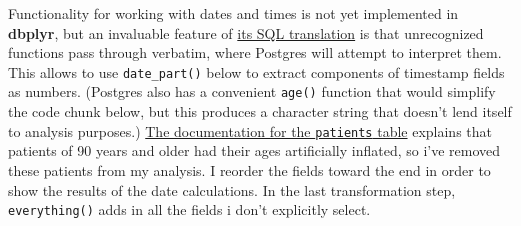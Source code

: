 \documentclass[]{article}
\begin{document}
Functionality for working with dates and times is not yet implemented in
\textbf{dbplyr}, but an invaluable feature of
\href{https://dbplyr.tidyverse.org/articles/sql-translation.html}{its
SQL translation} is that unrecognized functions pass through verbatim,
where Postgres will attempt to interpret them. This allows to use
\texttt{date\_part()} below to extract components of timestamp fields as
numbers. (Postgres also has a convenient \texttt{age()} function that
would simplify the code chunk below, but this produces a character
string that doesn't lend itself to analysis purposes.)
\href{https://mimic.physionet.org/mimictables/patients/}{The
documentation for the \texttt{patients} table} explains that patients of
90 years and older had their ages artificially inflated, so i've removed
these patients from my analysis. I reorder the fields toward the end in
order to show the results of the date calculations. In the last
transformation step, \texttt{everything()} adds in all the fields i
don't explicitly select.
\end{document}
